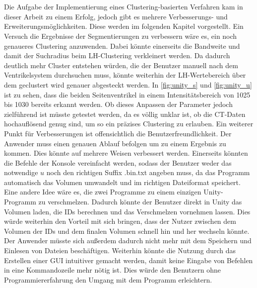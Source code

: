 \chapter{}
\label{sec:conclusion}



Die Aufgabe der Implementierung eines Clustering-basierten Verfahren kam in dieser Arbeit zu einem Erfolg, jedoch gibt es mehrere Verbesserungs- und Erweiterungsmöglichkeiten. Diese werden im folgenden Kapitel vorgestellt.
\newline
Ein Versuch die Ergebnisse der Segmentierungen zu verbessern wäre es, ein noch genaueres Clustering anzuwenden. Dabei könnte einerseits die Bandweite und damit der Suchradius beim LH-Clustering verkleinert werden. Da dadurch deutlich mehr Cluster entstehen würden, die der Benutzer manuell nach dem Ventrikelsystem durchsuchen muss, könnte weiterhin der LH-Wertebereich über dem geclustert wird genauer abgesteckt werden. In \autoref{fig:unity_s} und \autoref{fig:unity_u} ist zu sehen, dass die beiden Seitenventrikel in einem Intensitätsbereich von 1025 bis 1030 bereits erkannt werden. Ob dieses Anpassen der Parameter jedoch zielführend ist müsste getestet werden, da es völlig unklar ist, ob die CT-Daten hochauflösend genug sind, um so ein präzises Clustering zu erlauben.
\newline
Ein weiterer Punkt für Verbesserungen ist offensichtlich die Benutzerfreundlichkeit. Der Anwender muss einen genauen Ablauf befolgen um zu einem Ergebnis zu kommen. Dies könnte auf mehrere Weisen verbessert werden. Einerseits könnten die Befehle der Konsole vereinfacht werden, sodass der Benutzer weder das notwendige $u$ noch den richtigen Suffix .bin.txt  angeben muss, da das Programm automatisch das Volumen umwandelt und im richtigen Dateiformat speichert.
\newline
Eine andere Idee wäre es, die zwei Programme zu einem einzigen Unity-Programm zu verschmelzen. Dadurch könnte der Benutzer direkt in Unity das Volumen laden, die IDs berechnen und das Verschmelzen vornehmen lassen. Dies würde weiterhin den Vorteil mit sich bringen, dass der Nutzer zwischen dem Volumen der IDs und dem finalen Volumen schnell hin und her wechseln könnte. Der Anwender müsste sich außerdem dadurch nicht mehr mit dem Speichern und Einlesen von Dateien beschäftigen. Weiterhin könnte die Nutzung durch das Erstellen einer GUI intuitiver gemacht werden, damit keine Eingabe von Befehlen in eine Kommandozeile mehr nötig ist. Dies würde den Benutzern ohne Programmiererfahrung den Umgang mit dem Programm erleichtern.
